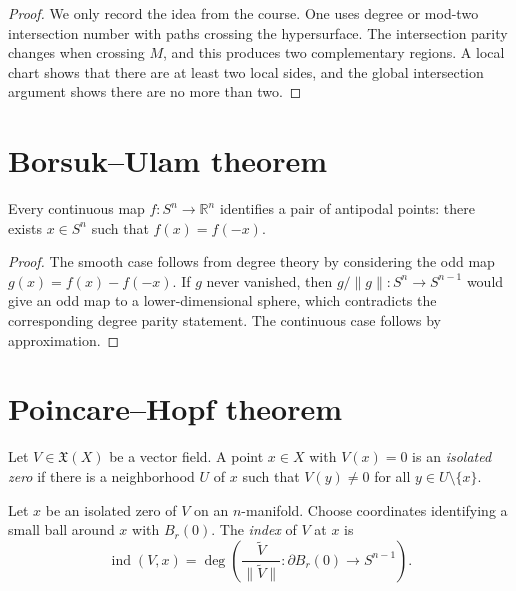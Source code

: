 \begin{proof}
We only record the idea from the course.  One
uses degree or mod-two intersection number
with paths crossing the hypersurface.  The
intersection parity changes when crossing
$M$, and this produces two complementary
regions.  A local chart shows that there are
at least two local sides, and the global
intersection argument shows there are no more
than two.
\end{proof}

\section{Borsuk--Ulam theorem}
\label{section-borsuk-ulam}

\begin{theorem}
\label{theorem-borsuk-ulam}
Every continuous map $f:S^n\to\mathbb R^n$
identifies a pair of antipodal points: there
exists $x\in S^n$ such that $f(x)=f(-x)$.
\end{theorem}

\begin{proof}
The smooth case follows from degree theory by
considering the odd map
$g(x)=f(x)-f(-x)$.  If $g$ never vanished,
then $g/\|g\|:S^n\to S^{n-1}$ would give an
odd map to a lower-dimensional sphere, which
contradicts the corresponding degree parity
statement.  The continuous case follows by
approximation.
\end{proof}

\section{Poincare--Hopf theorem}
\label{section-Poincare-Hopf-theorem}

\begin{definition}
\label{definition-isolated-zero-vector-field}
Let $V\in\mathfrak X(X)$ be a vector field.
A point $x\in X$ with $V(x)=0$ is an
{\it isolated zero} if there is a
neighborhood $U$ of $x$ such that
$V(y)\neq0$ for all $y\in U\setminus\{x\}$.
\end{definition}

\begin{definition}
\label{definition-index-vector-field}
Let $x$ be an isolated zero of $V$ on an
$n$-manifold.  Choose coordinates identifying
a small ball around $x$ with $B_r(0)$.
The {\it index} of $V$ at $x$ is
$$
\operatorname{ind}(V,x)
=
\deg\left(
\frac{\widetilde V}{\|\widetilde V\|}
:\partial B_r(0)\to S^{n-1}
\right).
$$
\end{definition}

